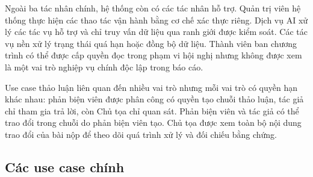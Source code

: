 Ngoài ba tác nhân chính, hệ thống còn có các tác nhân hỗ trợ. Quản trị viên hệ thống thực hiện các thao tác vận hành bằng cơ chế xác thực riêng. Dịch vụ AI xử lý các tác vụ hỗ trợ và chỉ truy vấn dữ liệu qua ranh giới được kiểm soát. Các tác vụ nền xử lý trạng thái quá hạn hoặc đồng bộ dữ liệu. Thành viên ban chương trình có thể được cấp quyền đọc trong phạm vi hội nghị nhưng không được xem là một vai trò nghiệp vụ chính độc lập trong báo cáo.

Use case thảo luận liên quan đến nhiều vai trò nhưng mỗi vai trò có quyền hạn khác nhau: phản biện viên được phân công có quyền tạo chuỗi thảo luận, tác giả chỉ tham gia trả lời, còn Chủ tọa chỉ quan sát. Phản biện viên và tác giả có thể trao đổi trong chuỗi do phản biện viên tạo. Chủ tọa được xem toàn bộ nội dung trao đổi của bài nộp để theo dõi quá trình xử lý và đối chiếu bằng chứng.

\subsection{Các use case chính}

